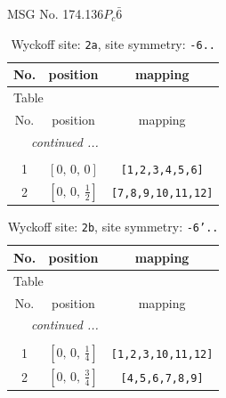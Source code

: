 \documentclass[fleqn,8pt]{jsarticle}
\begin{document}
\setcounter{MaxMatrixCols}{32}

\renewcommand{\tablename}{Table~}
\renewcommand{\figurename}{Figure~}
\begin{center}
\LARGE
MSG No. 174.136\quad$P_{c}\bar{6}$
\end{center}
\renewcommand{\arraystretch}{1.2}
\begin{longtable}{ccc}
\caption{Wyckoff site: {\tt 2a}, site symmetry: {\tt -6..}}
 \\
 \hline \hline
No. & position & mapping \\ \hline \endfirsthead

\multicolumn{2}{l}{\tablename\ \thetable{}} \\
 \hline \hline
No. & position & mapping \\ \hline \endhead

 \hline \hline
\multicolumn{2}{r}{\footnotesize\it continued ...} \\ \endfoot

 \hline \hline
\multicolumn{2}{r}{} \\ \endlastfoot

1 & $\left[ 0,\, 0,\, 0 \right]$ & {\tt [1,2,3,4,5,6]} \\ \hline
2 & $\left[ 0,\, 0,\, \frac{1}{2} \right]$ & {\tt [7,8,9,10,11,12]} \\
\end{longtable}
\renewcommand{\arraystretch}{1.2}
\begin{longtable}{ccc}
\caption{Wyckoff site: {\tt 2b}, site symmetry: {\tt -6'..}}
 \\
 \hline \hline
No. & position & mapping \\ \hline \endfirsthead

\multicolumn{2}{l}{\tablename\ \thetable{}} \\
 \hline \hline
No. & position & mapping \\ \hline \endhead

 \hline \hline
\multicolumn{2}{r}{\footnotesize\it continued ...} \\ \endfoot

 \hline \hline
\multicolumn{2}{r}{} \\ \endlastfoot

1 & $\left[ 0,\, 0,\, \frac{1}{4} \right]$ & {\tt [1,2,3,10,11,12]} \\ \hline
2 & $\left[ 0,\, 0,\, \frac{3}{4} \right]$ & {\tt [4,5,6,7,8,9]} \\
\end{longtable}
\end{document}
